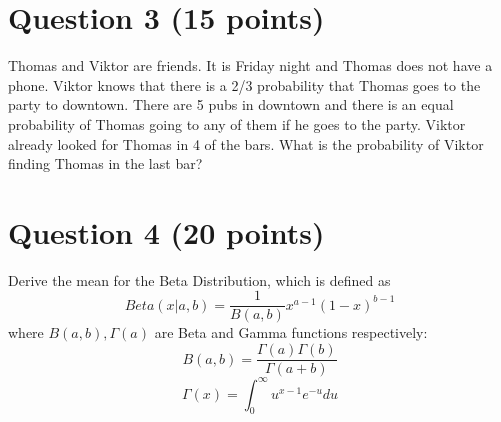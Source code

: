 \documentclass[
	10pt, %
]{../fphw}
\begin{document}
	\section*{Question 3 (15 points)}
	\begin{problem}
		Thomas and Viktor are friends. It is Friday night and Thomas does not have a phone. Viktor knows that there is a 2/3 probability
		that Thomas goes to the party to downtown. There are 5 pubs in downtown and there is an equal probability of Thomas going to
		any of them if he goes to the party. Viktor already looked for Thomas in 4 of the bars.
		What is the probability of Viktor finding Thomas in the last bar?
	\end{problem}

	\section*{Question 4 (20 points)}
	\begin{problem}
		Derive the mean for the Beta Distribution, which is defined as
		\begin{equation*}
			Beta(x|a,b)=\frac{1}{B(a,b)} x^{a-1}(1-x)^{b-1} 
		\end{equation*}
		where $B(a, b) , \Gamma(a)$ are Beta and Gamma functions respectively:
		\begin{equation*}
			B(a, b) = \frac{\Gamma (a)\Gamma (b)}{\Gamma (a+b)}
		\end{equation*}
		\begin{equation*}
			\Gamma(x) = \int_{0}^{\infty}u^{x-1}e^{-u}du
		\end{equation*}
	\end{problem}
\end{document}
